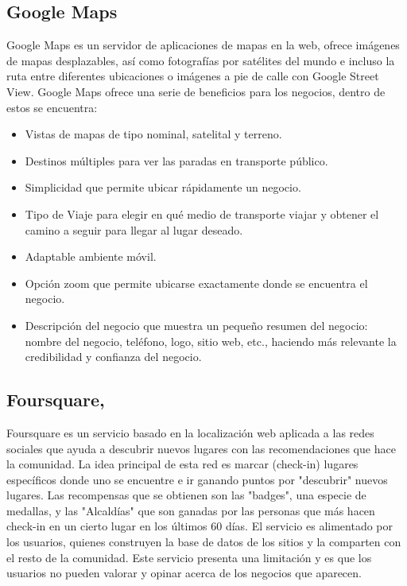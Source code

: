 \documentclass[12pt,letterpaper,openany]{book}
\begin{document}
\subsection{Google Maps\cite{23}}
Google Maps es un servidor de aplicaciones de mapas en la web, ofrece imágenes de mapas desplazables, así como fotografías por satélites del mundo e incluso la ruta entre diferentes ubicaciones o imágenes a pie de calle con Google Street View.
Google Maps ofrece una serie de beneficios para los negocios, dentro de estos se encuentra: 
\begin{itemize}
    \item Vistas de mapas de tipo nominal, satelital y terreno.
    \item Destinos múltiples para ver las paradas en transporte público.
    \item Simplicidad que permite ubicar rápidamente un negocio.
    \item Tipo de Viaje para elegir en qué medio de transporte viajar y obtener el camino a seguir para llegar al lugar deseado.
    \item Adaptable ambiente móvil.
    \item Opción zoom que permite ubicarse exactamente donde se encuentra el negocio.
    \item Descripción del negocio que muestra un pequeño resumen del negocio: nombre del negocio, teléfono, logo, sitio web, etc., haciendo más relevante la credibilidad y confianza del negocio.
\end{itemize}

\subsection{Foursquare\cite{24}, \cite{25}}
Foursquare es un servicio basado en la localización web aplicada a las redes sociales que ayuda a descubrir nuevos lugares con las recomendaciones que hace la comunidad.
La idea principal de esta red es marcar (check-in) lugares específicos donde uno se encuentre e ir ganando puntos por "descubrir" nuevos lugares.
Las recompensas que se obtienen son las "badges", una especie de medallas, y las "Alcaldías" que son ganadas por las personas que más hacen check-in en un cierto lugar en los últimos 60 días.
El servicio es alimentado por los usuarios, quienes construyen la base de datos de los sitios y la comparten con el resto de la comunidad. Este servicio presenta una limitación y es que los usuarios no pueden valorar y opinar acerca de los negocios que aparecen.
\end{document}
